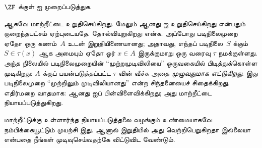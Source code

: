 \documentclass[../../../include/open-logic-section]{subfiles}
\begin{document}
\begin{prob}
	$\ZF$ க்குள் \stagescofin{} ஐ முறைப்படுத்துக.
\end{prob}

ஆகவே \stagescofin{} மாற்றீட்டை உறுதிசெய்கிறது. மேலும் \stagesinex{}
ஆனது \stagescofin{} ஐ உறுதிசெய்கிறது என்பதும் குறைந்தபட்சம் ஏற்புடையதே.
\stagescofin{} தோல்வியுறுகிறது என்க. அப்போது படிநிலைமுறை ஏதோ ஒரு கணம்~$A$
உடன் இறுதியிணையானது; அதாவது, எந்தப் படிநிலை~$S$ க்கும்
$S \in \tau(x)$ ஆக அமையும் ஏதோ ஓர் $x \in A$ இருக்குமாறு ஒரு வரைவு
$\tau$ நமக்குள்ளது. அந்த நிலையில் படிநிலைமுறையின் ``முற்றுமுடிவிலியை''
ஒருவகையில் பிடித்துக்கொள்ள முடிகிறது: $A$ க்குப் பயன்படுத்தப்பட்ட
$\tau$-வின் வீச்சு அதை \emph{முழுவதுமாக எட்டுகிறது}. இது படிநிலைமுறை
``முற்றிலும் முடிவிலியானது'' என்ற சிந்தனையைச் சிதைக்கிறது.
எதிர்மறை வாதமாக: \stagesinex{} ஆனது \stagescofin{} ஐப் பின்விளைவிக்கிறது;
அது மாற்றீட்டை நியாயப்படுத்துகிறது.

மாற்றீட்டுக்கு உள்ளார்ந்த நியாயப்படுத்தலை வழங்கும் உண்மையாகவே நம்பிக்கையூட்டும்
முயற்சி இது. ஆனால் இறுதியில் அது வெற்றிபெறுகிறதா இல்லையா என்பதை நீங்கள்
முடிவுசெய்வதற்கே விட்டுவிட வேண்டும்.
\end{document}
